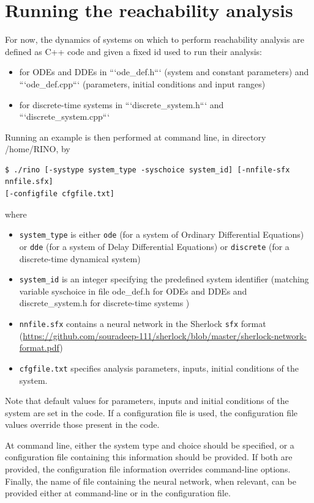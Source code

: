 \documentclass{article}
\begin{document}

\section{Running the reachability analysis \label{running}}

For now, the dynamics of systems on which to perform reachability analysis are defined as C++ code and given a fixed id used to run their analysis:
\begin{itemize}[noitemsep]
\item  for ODEs and DDEs in ```ode\_def.h``` (system and constant parameters) and ```ode\_def.cpp``` (parameters, initial conditions and input ranges)
\item for discrete-time systems in ```discrete\_system.h``` and ```discrete\_system.cpp``` 
  \end{itemize}
Running an example is then performed at command line, in directory /home/RINO, by 
\begin{verbatim}
$ ./rino [-systype system_type -syschoice system_id] [-nnfile-sfx nnfile.sfx] 
[-configfile cfgfile.txt]
\end{verbatim}
where 
\begin{itemize}[noitemsep]
\item \texttt{system\_type} is either \texttt{ode} (for a system of Ordinary Differential Equations) or \texttt{dde} (for a system of Delay Differential Equations) or \texttt{discrete} (for a discrete-time dynamical system)
\item \texttt{system\_id} is an integer specifying the predefined system identifier (matching variable syschoice in file ode\_def.h for ODEs and DDEs and  discrete\_system.h for discrete-time systems )
\item \texttt{nnfile.sfx}  contains a neural network in the Sherlock \texttt{sfx} format (\url{https://github.com/souradeep-111/sherlock/blob/master/sherlock-network-format.pdf}) 
\item \texttt{cfgfile.txt} specifies analysis parameters,  inputs,  initial conditions of the system.  
\end{itemize}

Note that default values for parameters, inputs and initial conditions of the system are set in the code.  If a configuration file is used,  the configuration file values override those present in the code. 

At command line,  either the system type and choice should be specified, or a configuration file containing this information should be provided.  If both are provided,  the configuration file information overrides command-line options.  Finally,  the  name of file containing the neural network, when relevant,  can be provided either at command-line or in the configuration file. 
\end{document}
